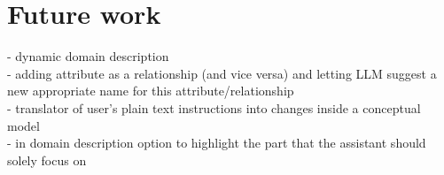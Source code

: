 \chapter{Future work}

- dynamic domain description \\

- adding attribute as a relationship (and vice versa) and letting LLM suggest a new appropriate name for this attribute/relationship \\

- translator of user's plain text instructions into changes inside a conceptual model \\

- in domain description option to highlight the part that the assistant should solely focus on \\